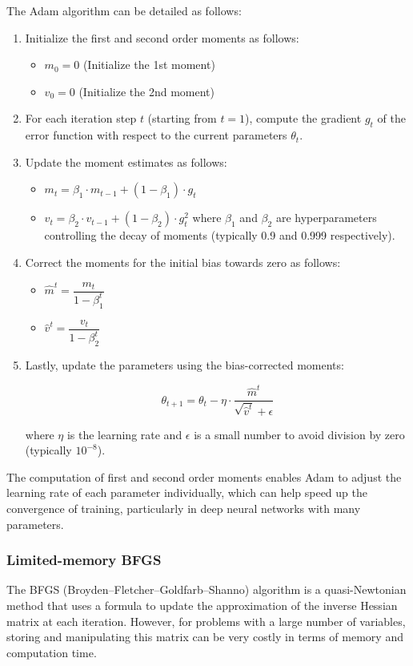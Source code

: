 The Adam algorithm can be detailed as follows:
\begin{enumerate}
    \item Initialize the first and second order moments as follows:
    \begin{itemize}
        \item $m_0=0$ (Initialize the 1st moment)
        \item $v_0=0$ (Initialize the 2nd moment)
    \end{itemize}
    \item For each iteration step $t$ (starting from $t=1$), compute the gradient $g_t$ of the error function with respect to the current parameters $\theta_t$.
    \item Update the moment estimates as follows:
    \begin{itemize}
        \item $m_t = \beta_1 \cdot m_{t-1} +(1-\beta_1) \cdot g_t$
        \item $v_t = \beta_2 \cdot v_{t-1} + (1-\beta_2) \cdot g_{t}^{2}$ 
        where $\beta_1$ and $\beta_2$ are hyperparameters controlling the decay of moments (typically 0.9 and 0.999 respectively).
    \end{itemize}
    \item Correct the moments for the initial bias towards zero as follows:
        \begin{itemize}
        \item $\hat{m}^t = \dfrac{m_t}{1 - \beta_{1}^{t}}$
        \item $\hat{v}^t = \dfrac{v_t}{1 - \beta_{2}^{t}}$
    \end{itemize}
    \item Lastly, update the parameters using the bias-corrected moments:

    $$\theta_{t+1} = \theta_t - \eta \cdot \dfrac{\hat{m}^t}{\sqrt{\hat{v}^t} + \epsilon}$$

where $\eta$ is the learning rate and $\epsilon$ is a small number to avoid division by zero (typically $10^{-8}$).
\end{enumerate}

The computation of first and second order moments enables Adam to adjust the learning rate of each parameter individually, which can help speed up the convergence of training, particularly in deep neural networks with many parameters.


\subsubsection{Limited-memory BFGS}
The BFGS (Broyden–Fletcher–Goldfarb–Shanno) algorithm is a quasi-Newtonian method that uses a formula to update the approximation of the inverse Hessian matrix at each iteration. However, for problems with a large number of variables, storing and manipulating this matrix can be very costly in terms of memory and computation time.

